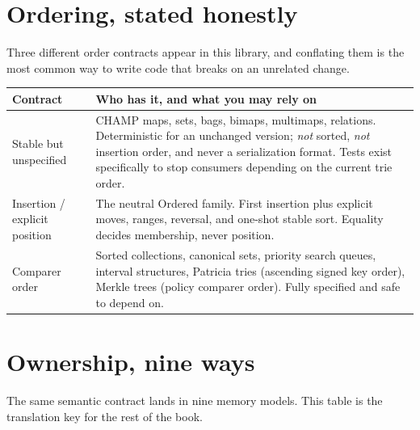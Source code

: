 \documentclass[11pt,twoside,openright]{book}
\makeatletter
\newenvironment{d7table}[1]
  {\par\vspace{3pt}\small
   \setlength{\LTpre}{4pt}\setlength{\LTpost}{4pt}
   \begin{longtable}{@{}%
     >{\raggedright\arraybackslash}p{#1\textwidth}%
     @{\hspace{10pt}}%
     >{\raggedright\arraybackslash}p{\dimexpr\textwidth-#1\textwidth-10pt\relax}@{}}}
  {\end{longtable}}
\newcommand{\thead}[1]{\sffamily\bfseries\footnotesize\color{d7ink}#1}
\makeatother
\begin{document}
\section{Ordering, stated honestly}

Three different order contracts appear in this library, and conflating them is
the most common way to write code that breaks on an unrelated change.

\begin{d7table}{0.24}
\toprule
\thead{Contract} & \thead{Who has it, and what you may rely on} \\
\midrule
Stable but unspecified & CHAMP maps, sets, bags, bimaps, multimaps, relations.
Deterministic for an unchanged version; \emph{not} sorted, \emph{not} insertion
order, and never a serialization format. Tests exist specifically to stop
consumers depending on the current trie order. \\
Insertion / explicit position & The neutral Ordered family. First insertion
plus explicit moves, ranges, reversal, and one-shot stable sort. Equality decides
membership, never position. \\
Comparer order & Sorted collections, canonical sets, priority search queues,
interval structures, Patricia tries (ascending signed key order), Merkle trees
(policy comparer order). Fully specified and safe to depend on. \\
\bottomrule
\end{d7table}

\section{Ownership, nine ways}

The same semantic contract lands in nine memory models. This table is the
translation key for the rest of the book.
\end{document}

